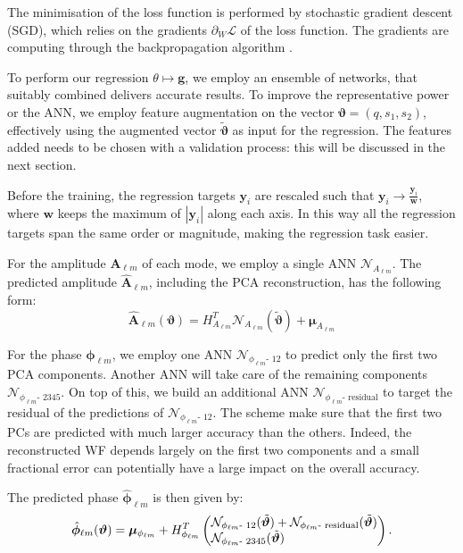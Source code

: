 \documentclass[twocolumn,showpacs,preprintnumbers,nofootinbib,prd,
superscriptaddress,10pt]{revtex4-1}
\begin{document}
The minimisation of the loss function is performed by stochastic gradient descent (SGD), which relies on the gradients $\partial_W \mathcal{L}$ of the loss function. The gradients are computing through the backpropagation algorithm \cite{}.

To perform our regression $\theta \longmapsto \boldsymbol{g}$, we employ an ensemble of networks, that suitably combined delivers accurate results.
To improve the representative power or the ANN, we employ feature augmentation on the vector $\boldsymbol{\vartheta} = (q, s_1, s_2)$, effectively using the augmented vector $\tilde{\boldsymbol{\vartheta}}$ as input for the regression. The features added needs to be chosen with a validation process: this will be discussed in the next section.

Before the training, the regression targets $\boldsymbol{y}_i$ are rescaled such that $\boldsymbol{y}_i \rightarrow \frac{\boldsymbol{y}_i}{\boldsymbol{w}}$, where $\boldsymbol{w}$ keeps the maximum of $|\boldsymbol{y}_i|$ along each axis. %
In this way all the regression targets span the same order or magnitude, making the regression task easier.

For the amplitude $\boldsymbol{A}_{\ell m}$ of each mode, we employ a single ANN $\mathcal{N}_{A_{\ell m}}$.
The predicted amplitude $\hat{\boldsymbol{A}}_{\ell m}$, including the PCA reconstruction, has the following form:
\begin{equation}\label{eq:amp_pred}
	\hat{\boldsymbol{A}}_{\ell m}(\boldsymbol{\vartheta}) = H_{A_{\ell m}}^T \mathcal{N}_{A_{\ell m}}(\tilde{\boldsymbol{\vartheta}}) + \boldsymbol{\mu}_{A_{\ell m}}
\end{equation}

For the phase $\boldsymbol{\phi}_{\ell m}$, we employ one ANN $\mathcal{N}_{\phi_{\ell m}\text{- 12}}$ to predict only the first two PCA components.
Another ANN will take care of the remaining components $\mathcal{N}_{\phi_{\ell m}\text{- 2345}}$.
On top of this, we build an additional ANN $\mathcal{N}_{\phi_{\ell m}\text{- residual}}$ to target the residual of the predictions of $\mathcal{N}_{\phi_{\ell m}\text{- 12}}$.
The scheme make sure that the first two PCs are predicted with much larger accuracy than the others. Indeed, the reconstructed WF depends largely on the first two components and a small fractional error can potentially have a large impact on the overall accuracy.

The predicted phase $\hat{\boldsymbol{\phi}}_{\ell m}$ is then given by:
%
\begin{equation}\label{eq:ph_pred}
	\hat{\boldsymbol{\phi}}_{\ell m}(\boldsymbol{\vartheta}) = \boldsymbol{\mu}_{\phi_{\ell m}} + H_{\phi_{\ell m}}^T 
	\begin{pmatrix}
        \mathcal{N}_{\phi_{\ell m}\text{- 12}}(\tilde{\boldsymbol{\vartheta}}) + \mathcal{N}_{\phi_{\ell m}\text{- residual}}(\tilde{\boldsymbol{\vartheta}}) \\
        \mathcal{N}_{\phi_{\ell m}\text{- 2345}}(\tilde{\boldsymbol{\vartheta}}) \hfill
	 \end{pmatrix}.
\end{equation}
\end{document}
